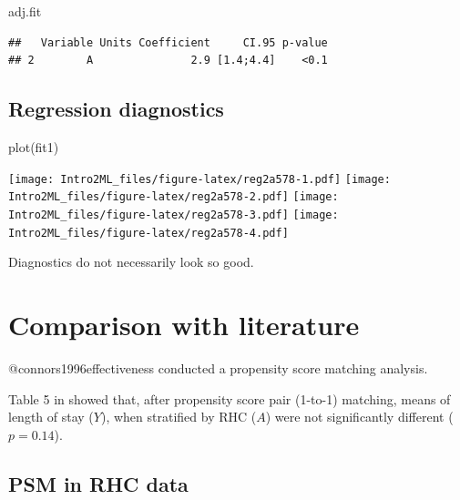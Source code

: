 \documentclass[
]{book}
\newenvironment{Shaded}{\begin{snugshade}}{\end{snugshade}}
\newcommand{\FunctionTok}[1]{\textcolor[rgb]{0.00,0.00,0.00}{#1}}
\newcommand{\NormalTok}[1]{#1}
\begin{document}
\begin{Shaded}
\begin{Highlighting}[]
\NormalTok{adj.fit}
\end{Highlighting}
\end{Shaded}

\begin{verbatim}
##   Variable Units Coefficient     CI.95 p-value
## 2        A               2.9 [1.4;4.4]    <0.1
\end{verbatim}

\hypertarget{regression-diagnostics}{%
\subsection{Regression diagnostics}\label{regression-diagnostics}}

\begin{Shaded}
\begin{Highlighting}[]
\FunctionTok{plot}\NormalTok{(fit1)}
\end{Highlighting}
\end{Shaded}

\texttt{[image: Intro2ML\_files/figure-latex/reg2a578-1.pdf]} \texttt{[image: Intro2ML\_files/figure-latex/reg2a578-2.pdf]} \texttt{[image: Intro2ML\_files/figure-latex/reg2a578-3.pdf]} \texttt{[image: Intro2ML\_files/figure-latex/reg2a578-4.pdf]}

\begin{rmdcomment}
Diagnostics do not necessarily look so good.
\end{rmdcomment}

\hypertarget{comparison-with-literature}{%
\section{Comparison with literature}\label{comparison-with-literature}}

\begin{rmdcomment}
@connors1996effectiveness conducted a propensity score matching
analysis.
\end{rmdcomment}

Table 5 in \citet{connors1996effectiveness} showed that, after propensity score pair (1-to-1) matching, means of length of stay (\(Y\)), when stratified by RHC (\(A\)) were not significantly different (\(p = 0.14\)).

\hypertarget{psm-in-rhc-data}{%
\subsection{PSM in RHC data}\label{psm-in-rhc-data}}
\end{document}
